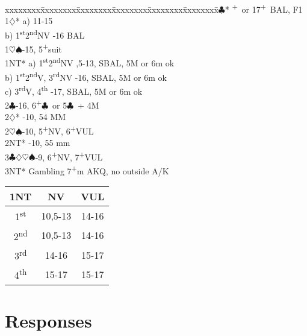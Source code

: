 \documentclass[10pt]{article}
\renewcommand{\c}{$\clubsuit$}
\renewcommand{\d}{$\diamondsuit$}
\newcommand{\h}{$\heartsuit$}
\newcommand{\s}{$\spadesuit$}
\newcommand{\p}{\textsuperscript{+}}
\newcommand{\sth}{1\textsuperscript{st}}
\newcommand{\ndh}{2\textsuperscript{nd}}
\newcommand{\rdh}{3\textsuperscript{rd}}
\newcommand{\thh}{4\textsuperscript{th}}
\newenvironment{bidtable}[1][]
{\textbf{#1}
  \begin{adjustwidth}{1em}{}
    \addvspace{2pt}
    \begin{tabbing}
      xxxxxxxx\=xxxxxxxx\=xxxxxxxx\=xxxxxxxx\=xxxxxxxx\=xxxxxxxx\=\kill}
{\end{tabbing}\end{adjustwidth}\bigskip}%
\begin{document}
\begin{multicols*}{2}
\begin{bidtable}
1\c*       {}\p\ or 17\p\ BAL, F1                         \\
1\d*       \> a) 11-15                                                   \\
       \> b) \sth \ndh NV         \>  -16 BAL                   \\
1\h\s      {}-15, 5\p suit                                            \\
1NT*       \> a) \sth \ndh NV         \>  ,5-13, SBAL, 5M or 6m ok \\
           \> b) \sth \ndh V, \rdh NV \>  -16, SBAL, 5M or 6m ok   \\
           \> c) \rdh V, \thh         \>  -17, SBAL, 5M or 6m ok   \\
2\c        {}-16, 6\p\c\ or 5\c\ + 4M                                \\
2\d*       {}-10, 54 MM                                                \\
2\h\s      {}-10, 5\p NV, 6\p VUL                                      \\
2NT*       -10, 55 mm                                                \\
3\c\d\h\s  {}-9, 6\p NV, 7\p VUL                                       \\
3NT*       \> Gambling 7\p m AKQ, no outside A/K
\end{bidtable}

\begin{tabular}{c|c|c}
  1NT & NV      & VUL   \\
  \hline
  \sth & 10,5-13 & 14-16 \\
  \ndh & 10,5-13 & 14-16 \\
  \rdh & 14-16   & 15-17 \\
  \thh & 15-17   & 15-17
\end{tabular}

\section{Responses}

\end{multicols*}
\end{document}

